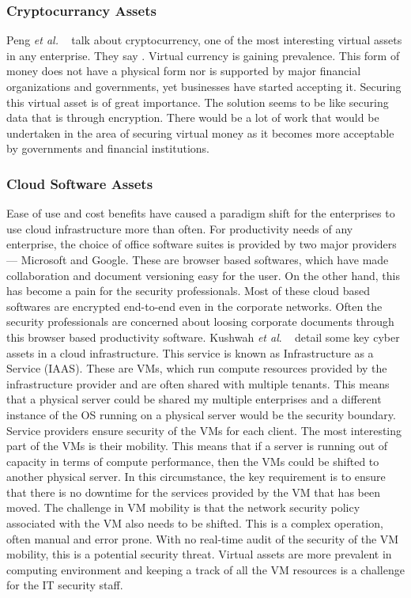 \subsubsection{Cryptocurrancy Assets} \label{sec:crypto_cur}
Peng \textit{et al.} ~\cite{4908498} talk about cryptocurrency, one of the most interesting virtual assets in any enterprise. They say . Virtual currency is gaining prevalence. This form of money does not have a physical form nor is supported by major financial organizations and governments, yet businesses have started accepting it. Securing this virtual asset is of great importance. The solution seems to be like securing data that is through encryption. There would be a lot of work that would be undertaken in the area of securing virtual money as it becomes more acceptable by governments and financial institutions.\\

\subsubsection{Cloud Software Assets}\label{sec:cloud_sw}
Ease of use and cost benefits have caused a paradigm shift for the enterprises to use cloud infrastructure more than often. For productivity needs of any enterprise, the choice of office software suites is provided by two major providers --- Microsoft and Google. These are browser based softwares, which have made collaboration and document versioning easy for the user. On the other hand, this has become a pain for the security professionals. Most of these cloud based softwares are encrypted end-to-end even in the corporate networks. Often the security professionals are concerned about loosing corporate documents through this browser based productivity software. Kushwah \textit{et al}. ~\cite{7546222} detail some key cyber assets in a cloud infrastructure. This service is known as Infrastructure as a Service (IAAS). These are VMs, which run compute resources provided by the infrastructure provider and are often shared with multiple tenants. This means that a physical server could be shared my multiple enterprises and a different instance of the OS running on a physical server would be the security boundary. Service providers ensure security of the VMs for each client. The most interesting part of the VMs is their mobility. This means that if a server is running out of capacity in terms of compute performance, then the VMs could be shifted to another physical server. In this circumstance, the key requirement is to ensure that there is no downtime for the services provided by the VM that has been moved. The challenge in VM mobility is that the network security policy associated with the VM also needs to be shifted. This is a complex operation, often manual and error prone. With no real-time audit of the security of the VM mobility, this is a potential security threat. Virtual assets are more prevalent in computing environment and keeping a track of all the VM resources is a challenge for the IT security staff. \\ 

